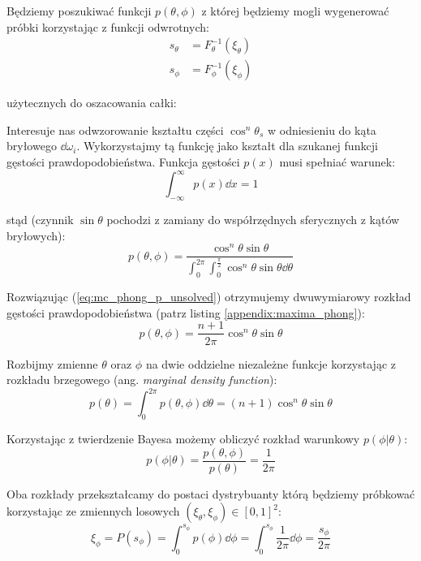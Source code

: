 \documentclass[../main.tex]{subfiles}
\begin{document}
Będziemy poszukiwać funkcji $p(\theta, \phi)$ z której będziemy mogli wygenerować próbki korzystając z funkcji odwrotnych:
\begin{equation}\begin{aligned}
  s_\theta &= F_{\theta}^{-1}(\xi_\theta) \\
  s_\phi &= F_{\phi}^{-1}(\xi_\phi)
\end{aligned}\end{equation}

\noindent użytecznych do oszacowania całki:

Interesuje nas odwzorowanie kształtu części $\cos^{n}\theta_s$ w odniesieniu do kąta bryłowego $\dd \omega_i$. Wykorzystajmy tą funkcję jako kształt dla szukanej funkcji gęstości prawdopodobieństwa. Funkcja gęstości $p(x)$ musi spełniać warunek:
\begin{equation}
\int_{-\infty}^{\infty} p(x) \dd x = 1 
\end{equation}

\noindent stąd (czynnik $\sin\theta$ pochodzi z zamiany do współrzędnych sferycznych z kątów bryłowych):
\begin{equation}
  p(\theta, \phi) = \frac{
    \cos^{n}{\theta} \sin\theta
  }{
    \int_{0}^{2\pi} \int_{0}^{\frac{\pi}{2}} {
      \cos^{n}{\theta} \sin\theta \dd \theta
    }
  }
\label{eq:mc_phong_p_unsolved}
\end{equation}

Rozwiązując (\ref{eq:mc_phong_p_unsolved}) otrzymujemy dwuwymiarowy rozkład gęstości prawdopodobieństwa (patrz listing \ref{appendix:maxima_phong}):
\begin{equation}
  p(\theta, \phi) =
    \frac{n+1}{2\pi} \cos^{n}\theta \sin\theta
\end{equation}

Rozbijmy zmienne $\theta$ oraz $\phi$ na dwie oddzielne niezależne funkcje korzystając z rozkładu brzegowego (ang. \textit{marginal density function}):
\begin{equation}
  p(\theta) = \int_{0}^{2\pi} {
    p(\theta, \phi) \dd \theta
  } =
  (n+1) \cos^{n}{\theta} \sin\theta
\end{equation}

Korzystając z twierdzenie Bayesa możemy obliczyć rozkład warunkowy $p(\phi | \theta)$:
\begin{equation}
  p(\phi | \theta) = \frac{
    p(\theta, \phi)
	}{
		p(\theta)
	} = \frac{1}{2\pi}
\end{equation}

Oba rozkłady przekształcamy do postaci dystrybuanty którą będziemy próbkować korzystając ze zmiennych losowych $(\xi_{\theta}, \xi_{\phi}) \in [0,1]^2$:
\begin{equation}
	\xi_\phi = P(s_{\phi}) =
	\int_{0}^{s_{\phi}} {
		p(\phi) \dd \phi
	} =
	\int_{0}^{s_{\phi}} {
		\frac{1}{2\pi} \dd \phi
	} =
	\frac{s_{\phi}}{2\pi}
\end{equation}
\end{document}
